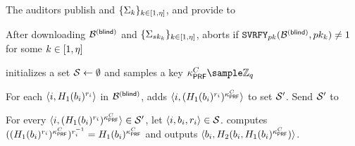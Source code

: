\begin{algorithm}[th!]
\begin{algorithmic}[1]
\State The auditors publish \blindedBlocklist and $\{ \Sigma_{k} \}_{k \in [1, \eta]}$, and provide \genericSetVar to \server






\EndProcedure

\Statex\Procedure{\evaluate}{\blindedBlocklist}


\State  After downloading $\blindedBlocklist$ and $\{ \auditorSig{\auditorPrivKeyGenericScheme[\auditorIdx]} \}_{\auditorIdx \in [1, \numAuditors]}$, \client aborts if $\verifyGenSig[\pubKey](\blindedBlocklist, \auditorPubKeyGenericScheme[\auditorIdx]) \neq 1$ for some $k \in [1, \eta]$


\State \client initializes a set $\genericSetVar \assign \emptyset$ and samples a key $\prfKeyClient \sample \integersModArg{\genericGrpOrd}$

\State For each $\langle \setIdx, \oprfRO[1](\genericBlocklistElmt[\setIdx])^{\genericRand[\setIdx]} \rangle$ in $\blindedBlocklist$, \client  adds $\langle \setIdx,  (\oprfRO[1](\genericBlocklistElmt[\setIdx])^{\genericRand[\setIdx]})^{\prfKeyClient} \rangle$ to set $\genericSetVar'$. Send $\genericSetVar'$ to \server



\State{}
\State For every $\langle \setIdx,  (\oprfRO[1](\genericBlocklistElmt[\setIdx])^{\genericRand[\setIdx]})^{\prfKeyClient} \rangle \in \genericSetVar'$, let  $\langle \setIdx, \genericBlocklistElmt[\setIdx], \genericRand[\setIdx] \rangle \in \genericSetVar$. \server computes $((\oprfRO[1](\genericBlocklistElmt[\setIdx])^{\genericRand[\setIdx]})^{\prfKeyClient})^{\genericRand[\setIdx]^{-1}} = \oprfRO[1](\genericBlocklistElmt[\setIdx])^{\prfKeyClient}$ and outputs $\langle \genericBlocklistElmt[\setIdx], \oprfRO[2](\genericBlocklistElmt[\setIdx], \oprfRO[1](\genericBlocklistElmt[\setIdx])^{\prfKeyClient}) \rangle$. 
\EndProcedure
\end{algorithmic}
\end{algorithm}
